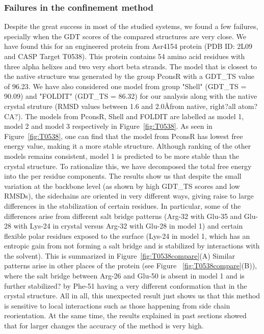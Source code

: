 \documentclass[12pt]{article}
\newcommand{\Alberto}[1]{\color{ForestGreen}#1\normalcolor }
\begin{document}
\subsubsection{Failures in the confinement method}

Despite the great success in most of the studied systems, we found a few failures, specially when
the GDT scores of the compared structures are very close. We have found this for an engineered
protein from Asr4154 protein (PDB ID: 2L09 and CASP Target T0538). This protein contains 54 amino
acid residues with three alpha helixes and two very short beta strands. The model that is closest to
the native structure was generated by the group PconsR with a GDT\_TS value of 96.23. We have also
considered one model from group "Shell" (GDT\_TS = 90.09) and "FOLDIT" (GDT\_TS = 86.32) for our
analysis along with the native crystal struture (RMSD values between 1.6 and 2.0\AA \Alberto{from
native, right?all atom? CA?}). The models from PconsR, Shell and FOLDIT are labelled as model 1,
model 2 and model 3 respectively in Figure~\ref{fig:T0538}. As seen in Figure~\ref{fig:T0538}, one
can find that the model from PconsR has lowest free energy value, making it a more stable structure.
Although ranking of the other models remains consistent, model 1 is predicted to be more stable than
the crystal structure. To rationalize this, we have decomposed the total free energy into the per
residue components. The results show us that despite the small variation at the backbone level (as
shown by high GDT\_TS scores and low RMSDs), the sidechains are oriented in very different ways,
giving raise to large differences in the stabilization of certain residues. In particular, some of
the differences arise from different salt bridge patterns (Arg-32 with Glu-35 and Glu-28 with Lys-24
in crystal versus Arg-32 with Glu-28 in model 1) and certain flexible polar residues exposed to the
surface (Lys-24 in model 1, which has an entropic gain from not forming a salt bridge and is
stabilized by interactions with the solvent). This is summarized in Figure~\ref{fig:T0538compare}(A)
Similar patterns arise in other places of the protein (see Figure ~\ref{fig:T0538compare}(B)), where
the salt bridge between Arg-26 and Glu-50 is absent in model 1 and is further \Alberto{stabilized?}
by Phe-51 having a very different conformation that in the crystal structure. All in all, this
unexpected result just shows us that this method is sensitive to local interactions such as those
happening from side chain reorientation. At the same time, the results explained in past sections
showed that for larger changes the accuracy of the method is very high.
\end{document}
